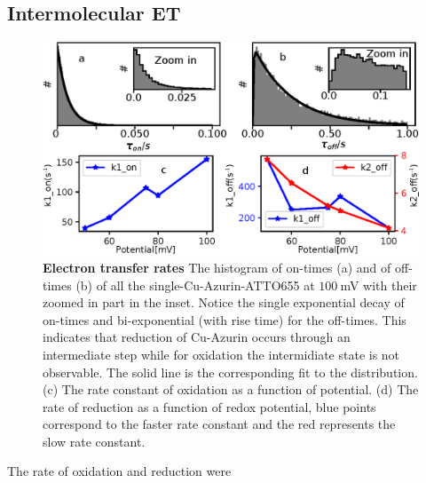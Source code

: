 \documentclass[journal=jacsat,manuscript=article]{achemso}
\begin{document}
\subsection{Intermolecular ET}
\begin{figure}
	\includegraphics[width=\textwidth]{many_sm_hist.eps}
	\caption{\textbf{Electron transfer rates} The histogram of on-times (a) and of off-times (b) of all the single-Cu-Azurin-ATTO655 at $100~$mV with their zoomed in part in the inset. Notice the single exponential decay of on-times and bi-exponential (with rise time) for the off-times. This indicates that  reduction of Cu-Azurin occurs through an intermediate step while for oxidation the intermidiate state is not observable. The solid line is the corresponding fit to the distribution. (c) The rate constant of oxidation as a function of potential. (d) The rate of reduction as a function of redox potential, blue points correspond to the faster rate constant and the red represents the slow rate constant.}
	\label{fig:many_sm_hist}
\end{figure}
The rate of oxidation and reduction were 
\end{document}
